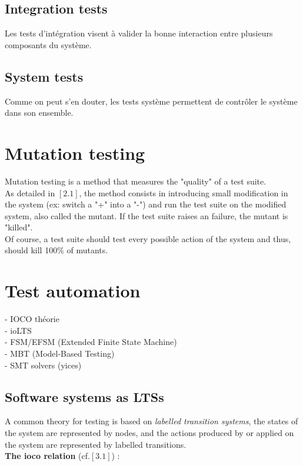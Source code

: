 \documentclass[a4paper]{report}
\begin{document}
\subsection*{Integration tests}
Les tests d'intégration visent à valider la bonne interaction entre plusieurs composants du système.

\subsection*{System tests}
Comme on peut s'en douter, les tests système permettent de contrôler le système dans son ensemble.


\section*{Mutation testing}
Mutation testing is a method that measures the "quality" of a test suite.\\
As detailed in $[2.1]$, the method consists in introducing small modification in the system (ex: switch a "+" into a "-") and run the test suite on the modified system, also called the mutant. If the test suite raises an failure, the mutant is "killed".\\
Of course, a test suite should test every possible action of the system and thus, should kill 100\% of mutants.

\section*{Test automation}
- IOCO théorie\\
- ioLTS\\
- FSM/EFSM (Extended Finite State Machine)\\
- MBT (Model-Based Testing)\\
- SMT solvers (yices)\\

\subsection*{Software systems as LTSs}
A common theory for testing is based on \textit{labelled transition systems}, the states of the system are represented by nodes, and the actions produced by or applied on the system are represented by labelled transitions.\\
\newline
\textbf{The ioco relation} (cf.$[3.1]$) :\\
\newline
\end{document}
